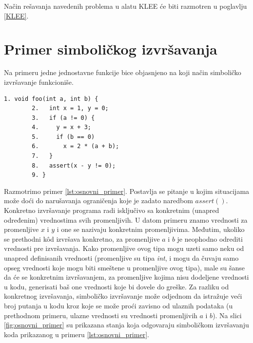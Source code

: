 \documentclass[12pt,oneside]{memoir}
\begin{document}
\noindent Način rešavanja navedenih problema u alatu KLEE će biti razmotren u poglavlju \ref{KLEE}.

\section{Primer simboličkog izvršavanja}
Na primeru jedne jednostavne funkcije bice objasnjeno na koji način simboličko izvršavanje funkcioniše.

    \begin{lstlisting}[caption={Osnovni primer simboličkog izvršavanja},captionpos=b,label={lst:osnovni_primer}]
        1. void foo(int a, int b) {
        2.   int x = 1, y = 0;
        3.   if (a != 0) {
        4.     y = x + 3;
        5.     if (b == 0)
        6.       x = 2 * (a + b);
        7.   }
        8.   assert(x - y != 0);
        9. }
    \end{lstlisting}

\noindent Razmotrimo primer \ref{lst:osnovni_primer}. Postavlja se pitanje u kojim situacijama može doći do narušavanja ograničenja koje je zadato naredbom $assert()$. 
Konkretno izvršavanje programa radi isključivo sa konkretnim (unapred određenim) vrednostima svih promenljivih. U datom primeru znamo vrednosti za promenljive $x$ i $y$ i one se nazivaju konkretnim promenljivima. Međutim, ukoliko se prethodni k\^od izvršava konkretno, za promenljive $a$ i $b$ je neophodno odrediti vrednosti pre izvršavanja. Kako promenljive ovog tipa mogu uzeti samo neku od unapred definisanih vrednosti (promenljive su tipa \textit{int}, i mogu da čuvaju samo opseg vrednosti koje mogu biti smeštene u promenljive ovog tipa), male su šanse da će se konkretnim izvršavanjem, za promenljive kojima nisu dodeljene vrednosti u kodu, generisati baš one vrednosti koje bi dovele do greške. Za razliku od konkretnog izvršavanja, simboličko izvršavanje može odjednom da istražuje veći broj putanja u kodu kroz koje se može proći zavisno od ulaznih podataka (u prethodnom primeru, ulazne vrednosti su vrednosti promenljivih $a$ i $b$). Na slici \ref{fig:osnovni_primer} su prikazana stanja koja odgovaraju simboličkom izvršavanju koda prikazanog u primeru \ref{lst:osnovni_primer}. 
\end{document}
